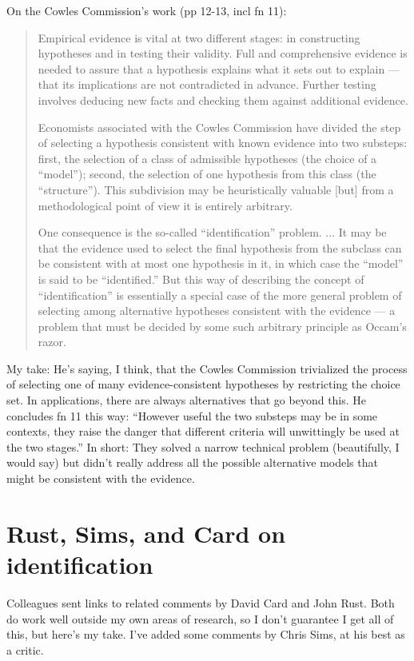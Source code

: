 \documentclass[11pt,letterpaper]{article}
\begin{document}
On the Cowles Commission's work (pp 12-13, incl fn 11):
%
\begin{quote}
Empirical evidence is vital at two different stages:
in constructing hypotheses and in testing their validity.
Full and comprehensive evidence is needed to assure that a hypothesis
explains what it sets out to explain ---
that its implications are not contradicted in advance.
Further testing involves deducing new facts and
checking them against additional evidence.

Economists associated with the Cowles Commission have divided the
step of selecting a hypothesis consistent with known evidence
into two substeps:
first, the selection of a class of admissible hypotheses
(the choice of a ``model'');
second, the selection of one hypothesis from this class (the ``structure'').
This subdivision may be heuristically valuable [but] from
a methodological point of view it is entirely arbitrary.

One consequence is the so-called ``identification'' problem. ...
It may be that the evidence used to select the final hypothesis
from the subclass can be consistent with at most one hypothesis in it,
in which case the ``model'' is said to be ``identified.''
But this way of describing the concept of ``identification'' is essentially
a special case of the more general problem of selecting among alternative
hypotheses consistent with the evidence --- a problem
that must be decided by some such arbitrary principle as Occam's razor.
\end{quote}
%
My take:  He's saying, I think, that
the Cowles Commission trivialized the process of selecting
one of many evidence-consistent hypotheses by restricting the choice set.
In applications, there are always alternatives that go beyond this.
He concludes fn 11 this way:
``However useful the two substeps may be in some contexts,
they raise the danger that different criteria will unwittingly be used
at the two stages.''
In short:  They solved a narrow technical problem (beautifully, I would say)
but didn't really address all the possible alternative models that might be consistent
with the evidence.



\section{Rust, Sims, and Card on identification}

Colleagues sent links to related comments by David Card and John Rust.
Both do work well outside my own areas of research,
so I don't guarantee I get all of this, but here's my take.
I've added some comments by Chris Sims, at his best as a critic.
\end{document}
